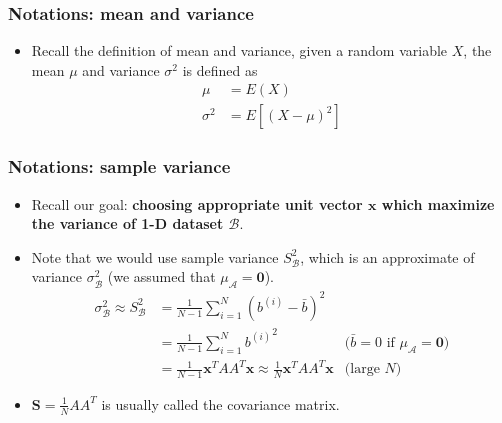 \documentclass[serif]{beamer}
\begin{document}
\begin{frame}
    \frametitle{Notations: mean and variance}
    \begin{itemize}
        \item Recall the definition of mean and variance, given a random variable $X$, the mean $\mu$ and variance $\sigma^2$ is defined as
        $$
        \begin{aligned}
            \mu      &= E(X)\\
            \sigma^2 &= E\left[(X - \mu)^2\right]
        \end{aligned}
        $$
    \end{itemize}
\end{frame}

\begin{frame}
    \frametitle{Notations: sample variance}
    \begin{itemize}
        \item Recall our goal: \textbf{choosing appropriate unit vector $\mathbf{x}$ which maximize the variance of 1-D dataset $\mathcal{B}$}.
        \item Note that we would use sample variance $S^2_\mathcal{B}$, which is an approximate of variance $\sigma_\mathcal{B}^2$ (we assumed that $\mu_\mathcal{A} = \mathbf{0}$).
        $$
        \begin{aligned}
            \sigma_\mathcal{B}^2 \approx S^2_\mathcal{B} &= \frac{1}{N-1}\sum_{i=1}^N (b^{(i)} - \bar{b})^2 & \\
            &= \frac{1}{N-1}\sum_{i=1}^N {b^{(i)}}^2 & \text{($\bar{b}=0$ if $\mu_\mathcal{A} = \mathbf{0}$)} \\
            &= \frac{1}{N-1}\mathbf{x}^TAA^T\mathbf{x} \approx \frac{1}{N}\mathbf{x}^TAA^T\mathbf{x} & \text{(large $N$)}
        \end{aligned}
        $$
        \item $\mathbf{S} = \displaystyle \frac{1}{N} AA^T$ is usually called the \alert{covariance matrix}.
    \end{itemize}
\end{frame}
\end{document}
